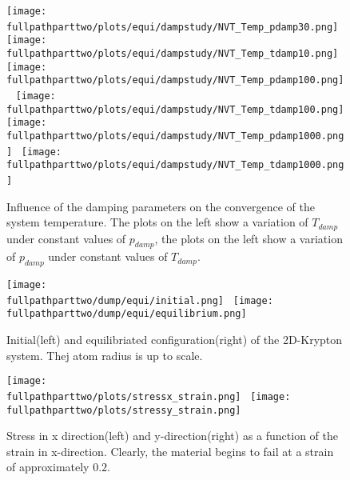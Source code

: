 \documentclass[10pt,a4paper]{report}
\def \fullpathparttwo {/home/lukas/Desktop/project/independence/atomistic_modeling/exam/2_Two-dimensional_atomic_tensile_test}
\begin{document}
\begin{center}
\begin{figure}[h]
\texttt{[image: \\fullpathparttwo/plots/equi/dampstudy/NVT\_Temp\_pdamp30.png]}~
\texttt{[image: \\fullpathparttwo/plots/equi/dampstudy/NVT\_Temp\_tdamp10.png]}
\texttt{[image: \\fullpathparttwo/plots/equi/dampstudy/NVT\_Temp\_pdamp100.png]}~
\texttt{[image: \\fullpathparttwo/plots/equi/dampstudy/NVT\_Temp\_tdamp100.png]}
\texttt{[image: \\fullpathparttwo/plots/equi/dampstudy/NVT\_Temp\_pdamp1000.png]}~
\texttt{[image: \\fullpathparttwo/plots/equi/dampstudy/NVT\_Temp\_tdamp1000.png]}~
\caption[aaa]{Influence of the damping parameters on the convergence of the system temperature. The plots on the left show a variation of $T_{damp}$ under constant values of $p_{damp}$, the plots on the left show a variation of $p_{damp}$ under constant values of $T_{damp}$.}
\label{fig:p2_dampstudy_PotEng}
\end{figure}
\end{center}


\begin{center}
\begin{figure}[h]
\texttt{[image: \\fullpathparttwo/dump/equi/initial.png]}~
\texttt{[image: \\fullpathparttwo/dump/equi/equilibrium.png]}
\caption[aaa]{Initial(left) and equilibriated configuration(right) of the 2D-Krypton system. Thej atom radius is up to scale.}
\label{fig:p2_equi_ovito}
\end{figure}
\end{center}


\begin{center}
\begin{figure}[h]
\texttt{[image: \\fullpathparttwo/plots/stressx\_strain.png]}~
\texttt{[image: \\fullpathparttwo/plots/stressy\_strain.png]}
\caption[aaa]{Stress in x direction(left) and y-direction(right) as a function of the strain in x-direction. Clearly, the material begins to fail at a strain of approximately $0.2$. }
\label{fig:p2_stress_strain_relation}
\end{figure}
\end{center}
\end{document}
